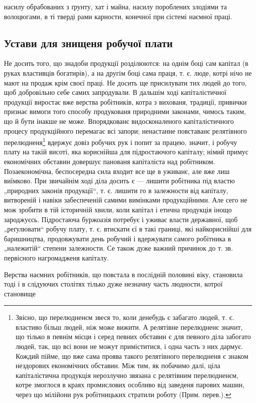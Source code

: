 \parcont{}
насилу обрабованих з ґрунту, хат і майна, насилу пороблених
злодіями та волоцюгами, в ті тверді рами карности,
конечної при сістемі наємної праці.

\subsection{Устави для знищеня робучої плати}

Не досить того, що знадоби продукції розділюются:
на однім боці сам капітал (в руках властивців богатирів),
а на другім боці сама праця, т. є. люде, котрі нічо не мают
на продаж крім своєї праці. Не досить ще присилувати
тих людей до того, щоб добровільно себе самих запродували.
В дальшім ході капіталістичної продукції виростає
вже верства робітників, котра з вихованя, традиції, привички
признає вимоги того способу продукованя природними законами,
чимось таким, що й бути інакше не може. Впорядкованє
видосконаленого капіталістичного процесу продукційного
перемагає всі запори; ненастанне повставанє релятівного
перелюдненя\footnote*{
Звісно, що перелюдненєм звеся то, коли денебудь є забагато
людей, т. є. властиво більш людей, ніж може вижити. А релятівне перелюдненє
значит, що тілько в певнім місци і серед певних обставин є для
певного діла забогато людей, так, що всі вони не можут приміститися,
і одна часть з них дармує. Кождий пійме, що вже сама проява такого
релятівного перелюдненя є знаком нездорових економічних обставин.
Між тим, як побачимо далі, ціла капіталістична продукція нерозлучно
звязана с релятівним перелюдненєм, котре змоглося в краях промислових
особливо від заведеня парових машин, через що мілійони рук робітницьких
стратили роботу (Прим. перев.).
} вдержує довіз робучих рук і попит
за працею, значит, і робучу плату на такій висоті, яка кориснійша
для підростаючого капіталу; німий примус економічних
обставин довершує панованя капіталіста над робітником.
Позаекономічна, беспосередна сила входит все ще
в уживанє, але вже лиш виїмково. При звичайнім ході діла
досить є — лишити робітника під властю „природних законів
продукції“, т. є. лишити го в залежности від капіталу,
витвореній і навіки забеспеченій самими вимінками
продукційними. Але сего не мож зробити в тій історичній
хвили, коли капітал і етична продукція інощо зароджуєсь.
Підростаюча буржоазія потребує і уживає власти державної,
щоб „реґулювати“ робучу плату, т. є. втискати єї в такі
границі, які найкориснійші для баришництва, продовжувати
день робучий і вдержувати самого робітника в „належитій“
степени залежности. Се також дуже важний причинок до
т. зв. первісного нагромадженя капіталу.

Верства наємних робітників, що повстала в послідній
половині  віку, становила тоді і в слідуючих столітях
тілько дуже незначну часть людности, котрої становище
\parbreak{}

